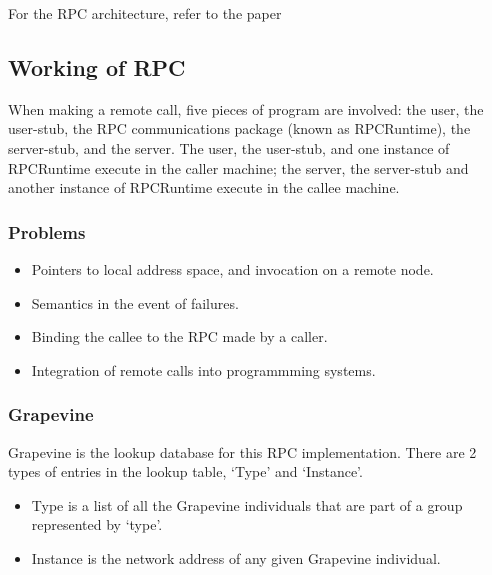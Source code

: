 \documentclass[a4paper]{article}
\begin{document}
For the RPC architecture, refer to the paper

\subsection{Working of RPC}
When making a remote call, five pieces of program are involved: the user, the user-stub, the RPC communications package (known as RPCRuntime), the server-stub, and the server. The user, the user-stub, and one instance of RPCRuntime execute in the caller machine; the server, the server-stub and another instance of RPCRuntime execute in the callee machine.

\subsubsection{Problems}
\begin{itemize}
\item
    Pointers to local address space, and invocation on a remote node.
\item
    Semantics in the event of failures.
\item
    Binding the callee to the RPC made by a caller.
\item
    Integration of remote calls into programmming systems.
\end{itemize}

\subsubsection{Grapevine}
Grapevine is the lookup database for this RPC implementation. There are 2 types of entries in the lookup table, `Type' and `Instance'.
\begin{itemize}
\item
    Type is a list of all the Grapevine individuals that are part of a group represented by `type'.
\item
    Instance is the network address of any given Grapevine individual.
\end{itemize}
\end{document}
